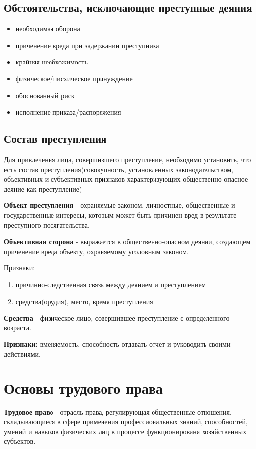 \documentclass[a5paper,10pt]{article}
\begin{document}
		\subsection{Обстоятельства, исключающие преступные деяния}
			\begin{itemize}[itemsep=0pt]
				\item необходимая оборона
				\item приченение вреда при задержании преступника
				\item крайняя необхожимость
				\item физическое/писхическое принуждение
				\item обоснованный риск
				\item исполнение приказа/распоряжения
			\end{itemize}

		\subsection{Состав преступления}
			Для привлечения лица, совершившего преступление, необходимо установить, что есть состав преступления(совокупность, установленных законодательством, объективных и субъективных признаков характеризующих общественно-опасное деяние как преступление)

			\textbf{Объект преступления} - охраняемые законом, личностные, общественные и государственные интересы, которым может быть причинен вред в результате преступного посягательства.

			\textbf{Объективная сторона} - выражается в общественно-опасном деянии, создающем приченение вреда объекту, охраняемому уголовным законом.

			\underline{Признаки:}
			\begin{enumerate}[itemsep=0pt]
				\item причинно-следственная связь между деянием и преступлением
				\item средства(орудия), место, время преступления
			\end{enumerate}

			\textbf{Средства} - физическое лицо, совершившее преступление с определенного возраста.

			\textbf{Признаки:} вменяемость, способность отдавать отчет и руководить своими действиями.

	\section{Основы трудового права}
		\textbf{Трудовое право} - отрасль права, регулирующая общественные отношения, складывающиеся в сфере применения профессиональных знаний, способностей, умений и навыков физических лиц в процессе функционированя хозяйственных субъектов.
\end{document}
